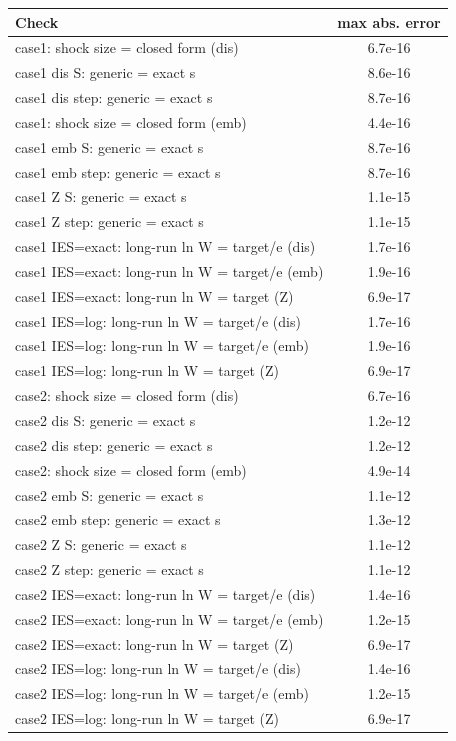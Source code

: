 \begin{tabular}{lc}\toprule Check & max abs. error\\\midrule
case1: shock size = closed form (dis) & 6.7e-16\\
case1 dis S: generic = exact s & 8.6e-16\\
case1 dis step: generic = exact s & 8.7e-16\\
case1: shock size = closed form (emb) & 4.4e-16\\
case1 emb S: generic = exact s & 8.7e-16\\
case1 emb step: generic = exact s & 8.7e-16\\
case1 Z S: generic = exact s & 1.1e-15\\
case1 Z step: generic = exact s & 1.1e-15\\
case1 IES=exact: long-run ln W = target/e (dis) & 1.7e-16\\
case1 IES=exact: long-run ln W = target/e (emb) & 1.9e-16\\
case1 IES=exact: long-run ln W = target (Z) & 6.9e-17\\
case1 IES=log: long-run ln W = target/e (dis) & 1.7e-16\\
case1 IES=log: long-run ln W = target/e (emb) & 1.9e-16\\
case1 IES=log: long-run ln W = target (Z) & 6.9e-17\\
case2: shock size = closed form (dis) & 6.7e-16\\
case2 dis S: generic = exact s & 1.2e-12\\
case2 dis step: generic = exact s & 1.2e-12\\
case2: shock size = closed form (emb) & 4.9e-14\\
case2 emb S: generic = exact s & 1.1e-12\\
case2 emb step: generic = exact s & 1.3e-12\\
case2 Z S: generic = exact s & 1.1e-12\\
case2 Z step: generic = exact s & 1.1e-12\\
case2 IES=exact: long-run ln W = target/e (dis) & 1.4e-16\\
case2 IES=exact: long-run ln W = target/e (emb) & 1.2e-15\\
case2 IES=exact: long-run ln W = target (Z) & 6.9e-17\\
case2 IES=log: long-run ln W = target/e (dis) & 1.4e-16\\
case2 IES=log: long-run ln W = target/e (emb) & 1.2e-15\\
case2 IES=log: long-run ln W = target (Z) & 6.9e-17\\

\end{tabular}
